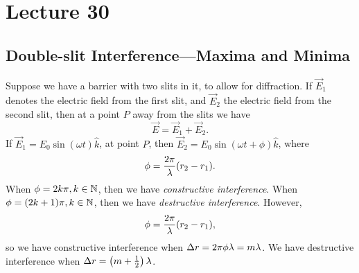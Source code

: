 \documentclass[class=article, crop=false]{standalone}
\begin{document}
  \section{Lecture 30}
  \subsection{Double-slit Interference---Maxima and Minima}
  Suppose we have a barrier with two slits in it, to allow for diffraction. If $\vec{E}_1$ denotes the electric field from the first slit, and $\vec{E}_2$ the electric field from the second slit, then at a point $P$ away from the slits we have
  \[
    \vec{E} = \vec{E}_1 + \vec{E}_2.
  \]
  If $\vec{E}_1 = E_0\sin(\omega t)\hat{k}$, at point $P$, then $\vec{E}_2 = E_0\sin(\omega t + \phi)\hat{k}$, where
  \[
    \phi = \frac{2\pi}{\lambda}(r_2-r_1).
  \]
  When $\phi  = 2k\pi, k\in \mathbb{N}$, then we have \emph{constructive interference}. When $\phi = (2k + 1)\pi, k\in\mathbb{N}$, then we have \emph{destructive interference}. However,
  \[
    \phi = \frac{2\pi}{\lambda}(r_2-r_1),
  \]
  so we have constructive interference when $\Delta r = 2\pi\phi\lambda = m\lambda$. We have destructive interference when $\Delta r = \left( m + \frac{1}{2} \right)\lambda$.
\end{document}
